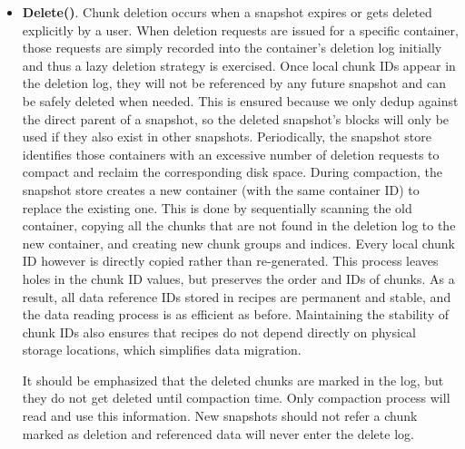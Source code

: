 \begin{itemize}
\item
\noindent\textbf{Delete()}.
Chunk deletion occurs when a snapshot expires or gets deleted explicitly by a user. 
When deletion requests are issued for a specific container,
those requests are simply recorded into the  container's deletion log initially and thus  a lazy
deletion strategy is exercised.
Once local chunk IDs appear in
the deletion log, they will not be referenced by any future snapshot and can be safely deleted when needed. 
This is ensured because we only dedup against the direct parent of a snapshot, so the deleted snapshot's blocks
will only be used if they also exist in other snapshots.
Periodically, the snapshot  store identifies those containers with an excessive
number of deletion requests to  compact and  reclaim the corresponding disk space. 
During compaction, the snapshot store creates a new container (with the same container ID) to replace the 
existing one. This is done by sequentially scanning the old container, copying all the chunks that are not 
found in the deletion log to the new container, and creating new chunk groups and indices. 
Every local chunk ID however is directly copied rather than re-generated. This
process leaves holes in the chunk ID values, but preserves the order and IDs of chunks.
As a result, all data reference IDs stored 
in recipes are permanent and stable, and the data reading process
is as efficient as before. Maintaining the stability of chunk IDs also ensures that recipes do not
depend directly on physical storage locations, which simplifies data migration.

It should be emphasized that the deleted chunks are marked in the log, but they do not get deleted until compaction
time.  Only compaction process will read and use this information.  
New snapshots should not refer a chunk marked as deletion
and referenced data will never enter the delete log. 
\end{itemize}


